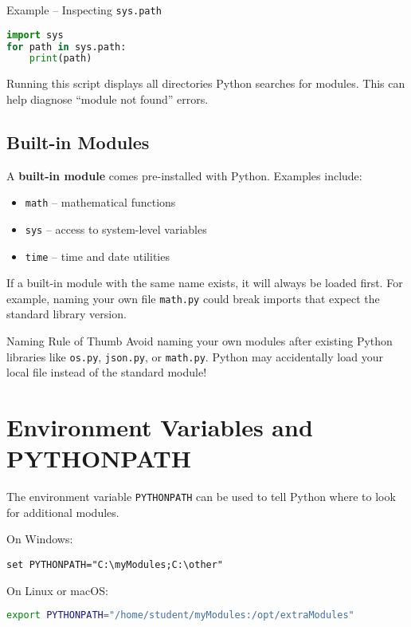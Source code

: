 \documentclass[12pt]{article}
\begin{document}
\begin{conceptbox}{Example – Inspecting \texttt{sys.path}}
\begin{lstlisting}[language=Python]
import sys
for path in sys.path:
    print(path)
\end{lstlisting}
Running this script displays all directories Python searches for modules.  
This can help diagnose “module not found” errors.
\end{conceptbox}

\subsection*{Built-in Modules}
A \textbf{built-in module} comes pre-installed with Python.  
Examples include:
\begin{itemize}
  \item \texttt{math} – mathematical functions
  \item \texttt{sys} – access to system-level variables
  \item \texttt{time} – time and date utilities
\end{itemize}

If a built-in module with the same name exists, it will always be loaded first.  
For example, naming your own file \texttt{math.py} could break imports that expect the standard library version.

\begin{reflectionbox}{Naming Rule of Thumb}
Avoid naming your own modules after existing Python libraries like \texttt{os.py}, \texttt{json.py}, or \texttt{math.py}.  
Python may accidentally load your local file instead of the standard module!
\end{reflectionbox}

\section{Environment Variables and PYTHONPATH}

The environment variable \texttt{PYTHONPATH} can be used to tell Python where to look for additional modules.  

On Windows:
\begin{lstlisting}
set PYTHONPATH="C:\myModules;C:\other"
\end{lstlisting}

On Linux or macOS:
\begin{lstlisting}[language=bash]
export PYTHONPATH="/home/student/myModules:/opt/extraModules"
\end{lstlisting}
\end{document}
